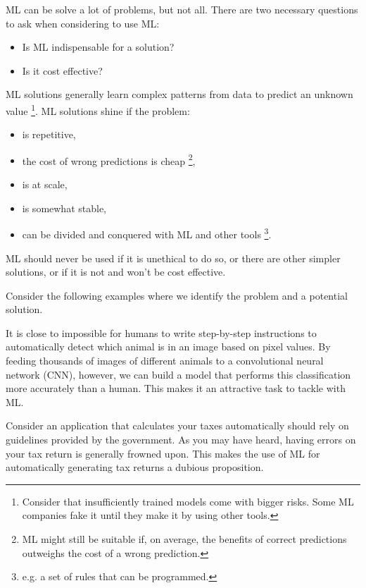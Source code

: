 ML can be solve a lot of problems, but not all. There are two
necessary questions to ask when considering to use ML:
\begin{itemize}
    \item Is ML indispensable for a solution?
    \item Is it cost effective?
\end{itemize}
ML solutions generally learn complex patterns from data to predict
an unknown value
\footnote{
    Consider that insufficiently trained models come with bigger
    risks. Some ML companies fake it until they make it by using
    other tools.
}.
ML solutions shine if the problem:
\begin{itemize}
    \item is repetitive,
    \item the cost of wrong predictions is cheap
    \footnote{
        ML might still be suitable if, on average, the benefits 
        of correct predictions outweighs the cost of a wrong
        prediction.
    },
    \item is at scale,
    \item is somewhat stable,
    \item can be divided and conquered with ML and other tools
    \footnote{
        e.g. a set of rules that can be programmed.
    }.
\end{itemize}
ML should never be used if it is unethical to do so, or there are
other simpler solutions, or if it is not and won't be cost effective.

Consider the following examples where we identify the problem and
a potential solution.

It is close to impossible for humans to write step-by-step
instructions to automatically detect which animal is in an image
based on pixel values. By feeding thousands of images of different
animals to a convolutional neural network (CNN), however, we can
build a model that performs this classification more accurately
than a human. This makes it an attractive task to tackle with ML.

Consider an application that calculates your taxes automatically
should rely on guidelines provided by the government. As you may
have heard, having errors on your tax return is generally frowned
upon. This makes the use of ML for automatically generating tax
returns a dubious proposition.

